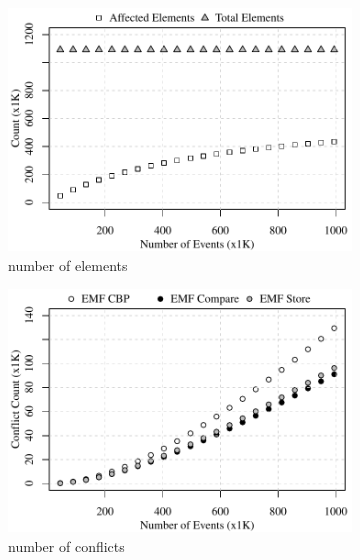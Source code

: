 \begin{figure}[ht]
  \centering
  \begin{subfigure}[t]{0.490\linewidth}
    \includegraphics[width=\linewidth]{conflict-size-events}
    \caption{number of elements}
    \label{fig:conflict-size-events}
  \end{subfigure}
  \hfill
  \begin{subfigure}[t]{0.490\linewidth}
    \includegraphics[width=\linewidth]{conflict-count-events}
    \caption{number of conflicts}
    \label{fig:conflict-count-events}
  \end{subfigure}
  \\
  \begin{subfigure}[t]{0.490\linewidth}

\end{subfigure}
\end{figure}
